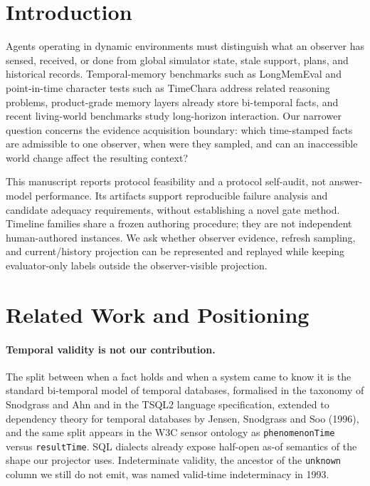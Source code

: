 \documentclass[11pt]{article}
\begin{document}
\section{Introduction}
Agents operating in dynamic environments must distinguish what an observer has sensed, received, or done from global simulator state, stale support, plans, and historical records. Temporal-memory benchmarks such as LongMemEval and point-in-time character tests such as TimeChara address related reasoning problems, product-grade memory layers already store bi-temporal facts, and recent living-world benchmarks study long-horizon interaction. Our narrower question concerns the evidence acquisition boundary: which time-stamped facts are admissible to one observer, when were they sampled, and can an inaccessible world change affect the resulting context?

This manuscript reports protocol feasibility and a protocol self-audit, not answer-model performance. Its artifacts support reproducible failure analysis and candidate adequacy requirements, without establishing a novel gate method. Timeline families share a frozen authoring procedure; they are not independent human-authored instances. We ask whether observer evidence, refresh sampling, and current/history projection can be represented and replayed while keeping evaluator-only labels outside the observer-visible projection.

\section{Related Work and Positioning}
\paragraph{Temporal validity is not our contribution.} The split between when a fact holds and when a system came to know it is the standard bi-temporal model of temporal databases, formalised in the taxonomy of Snodgrass and Ahn and in the TSQL2 language specification, extended to dependency theory for temporal databases by Jensen, Snodgrass and Soo (1996), and the same split appears in the W3C sensor ontology as \texttt{phenomenonTime} versus \texttt{resultTime}. SQL dialects already expose half-open as-of semantics of the shape our projector uses. Indeterminate validity, the ancestor of the \texttt{unknown} column we still do not emit, was named valid-time indeterminacy in 1993.
\end{document}
